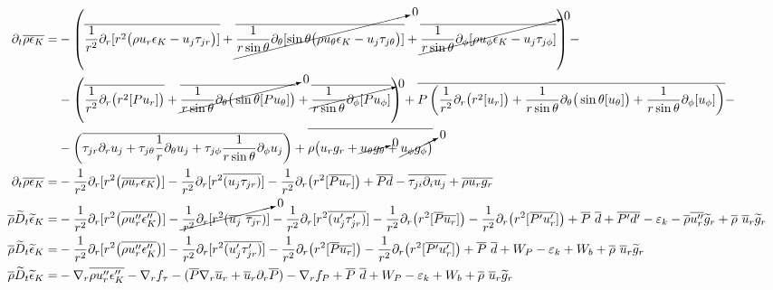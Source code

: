 \documentclass[10pt,paper=a4]{report}
\newcommand{\eht}{\overline}
\newcommand{\fht}{\widetilde}
\begin{document}
\begin{align}
\partial_{t} \eht{\rho \epsilon_K} = & -\left( \eht{\frac{1}{r^2}\partial_r [r^2 \big(\rho u_r \epsilon_K - u_j\tau_{jr}\big)]} + \cancelto{0}{\eht{\frac{1}{r\sin{\theta}} \partial_\theta [\sin{\theta} \big(\rho u_\theta \epsilon_K - u_j\tau_{j\theta} \big)]}} + \cancelto{0}{\eht{\frac{1}{r\sin{\theta}} \partial_\phi [\rho u_\phi \epsilon_K - u_j\tau_{j\phi}]}} \right) - \nonumber \\
& -\left( \eht{\frac{1}{r^2} \partial_r \big( r^2 [P u_r] \big)} + \cancelto{0}{\eht{\frac{1}{r \sin{\theta}} \partial_\theta \big(\sin{\theta}[P u_\theta] \big)}} + \cancelto{0}{\eht{\frac{1}{r\sin{\theta}} \partial_\phi [ P u_\phi ]}} \right) + \eht{P \left( \frac{1}{r^{2}}\partial_{r}\big(r^{2}[u_{r}]\big) + \frac{1}{r\sin{\theta}}\partial_{\theta} \big(\sin{\theta} [u_{\theta}]\big) + \frac{1}{r\sin{\theta}}\partial_{\phi} [u_{\phi}]  \right)} - \nonumber \\
& -  \left( \eht{\tau_{jr} \partial_r u_j + \tau_{j\theta} \frac{1}{r}\partial_\theta u_j + \tau_{j\phi} \frac{1}{r\sin{\theta}}\partial_\phi u_j}  \right)  + \eht{\rho \big( u_{r} g_r + \cancelto{0}{u_{\theta} g_\theta} + \cancelto{0}{u_{\phi} g_\phi \big)}} \\
\partial_{t} \eht{\rho \epsilon_K} = & -\frac{1}{r^2}\partial_r [r^2 \big(\eht{\rho u_r \epsilon_K}\big)] -\frac{1}{r^2}\partial_r [r^2 \eht{(u_j\tau_{jr})}] -\frac{1}{r^2} \partial_r \big( r^2 [\eht{P u_r}] \big) + \eht{P d} -\eht{\tau_{ji} \partial_i u_j}  + \eht{\rho u_{r} g_r} \\
\eht{\rho}\fht{D}_t \fht{\epsilon}_K = & -\frac{1}{r^2}\partial_r [r^2 \big(\eht{\rho u''_r \epsilon''_K}\big)] -\cancelto{0}{\frac{1}{r^2}\partial_r [r^2 (\eht{u_j} \ \eht{\tau_{jr}})]} - \frac{1}{r^2}\partial_r [r^2 \eht{(u'_j \tau'_{jr})}] - \frac{1}{r^2} \partial_r \big( r^2 [\eht{P} \eht{u_r}] \big) - \frac{1}{r^2} \partial_r \big( r^2 [\eht{P' u'_r}] \big) + \eht{P} \ \eht{d} + \eht{P'd'} -\varepsilon_k  - \eht{\rho} \eht{u''_{r}} \fht{g}_r + \eht{\rho} \ \eht{u}_r \fht{g}_r \\ 
\eht{\rho}\fht{D}_t \fht{\epsilon}_K = & -\frac{1}{r^2}\partial_r [r^2 \big(\eht{\rho u''_r \epsilon''_K}\big)] - \frac{1}{r^2}\partial_r [r^2 \eht{(u'_j \tau'_{jr})}] - \frac{1}{r^2} \partial_r \big( r^2 [\eht{P} \eht{u_r}] \big) - \frac{1}{r^2} \partial_r \big( r^2 [\eht{P' u'_r}] \big) + \eht{P} \ \eht{d} + W_P -\varepsilon_k  + W_b + \eht{\rho} \ \eht{u}_r \fht{g}_r \\
\eht{\rho}\fht{D}_t \fht{\epsilon}_K = & -\nabla_r \eht{\rho u''_r \epsilon''_K} - \nabla_r f_\tau - (\eht{P}\nabla_r \eht{u}_r + \eht{u}_r \partial_r \eht{P}) - \nabla_r f_P + \eht{P} \ \eht{d} + W_P -\varepsilon_k  + W_b + \eht{\rho} \ \eht{u}_r \fht{g}_r \\

\end{align}
\end{document}
